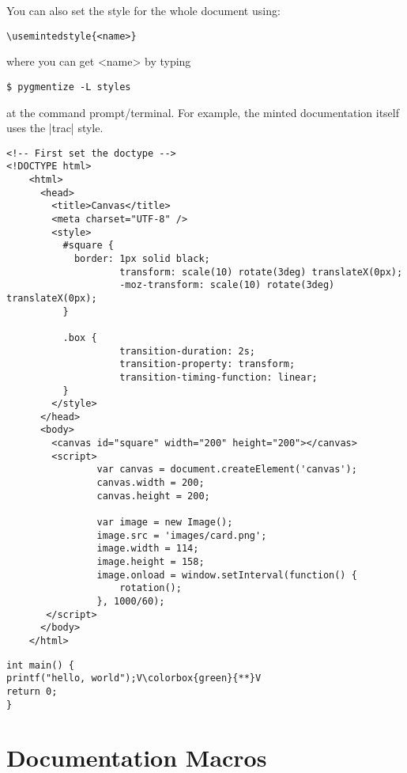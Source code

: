 You can also set the style for the whole document using:

\begin{verbatim}
\usemintedstyle{<name>}
\end{verbatim}
where you can get <name> by typing

\begin{verbatim}
$ pygmentize -L styles
\end{verbatim}
at the command prompt/terminal. For example, the minted documentation itself uses the |trac| style.

\begin{verbatim}
<!-- First set the doctype -->
<!DOCTYPE html>
    <html>
      <head>
        <title>Canvas</title>
        <meta charset="UTF-8" />
        <style>
          #square {
            border: 1px solid black;
                    transform: scale(10) rotate(3deg) translateX(0px);
                    -moz-transform: scale(10) rotate(3deg) translateX(0px);
          }

          .box {              
                    transition-duration: 2s;
                    transition-property: transform;
                    transition-timing-function: linear;
          }
        </style>
      </head>
      <body>
        <canvas id="square" width="200" height="200"></canvas>
        <script>
                var canvas = document.createElement('canvas');
                canvas.width = 200;
                canvas.height = 200;

                var image = new Image();
                image.src = 'images/card.png';
                image.width = 114;
                image.height = 158;
                image.onload = window.setInterval(function() {
                    rotation();
                }, 1000/60);
       </script>
      </body>
    </html>
\end{verbatim} 
   



\begin{lstlisting}
int main() {
printf("hello, world");V\colorbox{green}{**}V
return 0;
}
\end{lstlisting}



\chapter{Documentation Macros}


